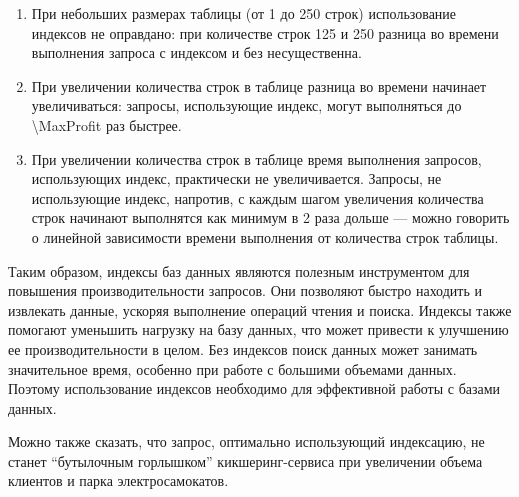 \begin{enumerate}
    \item При небольших размерах таблицы (от 1 до 250 строк) использование индексов не оправдано: при количестве строк 125 и 250 разница во времени выполнения запроса с индексом и без несущественна.
    \item При увеличении количества строк в таблице разница во времени начинает увеличиваться: запросы, использующие индекс, могут выполняться до \num[round-precision=0, round-mode=places]{\MaxProfit} раз быстрее.
    \item При увеличении количества строк в таблице время выполнения запросов, использующих индекс, практически не увеличивается. Запросы, не использующие индекс, напротив, с каждым шагом увеличения количества строк начинают выполнятся как минимум в 2 раза дольше --- можно говорить о линейной зависимости времени выполнения от количества строк таблицы.
\end{enumerate}

Таким образом, индексы баз данных являются полезным инструментом для повышения производительности запросов. Они позволяют быстро находить и извлекать данные, ускоряя выполнение операций чтения и поиска. Индексы также помогают уменьшить нагрузку на базу данных, что может привести к улучшению ее производительности в целом. Без индексов поиск данных может занимать значительное время, особенно при работе с большими объемами данных. Поэтому использование индексов необходимо для эффективной работы с базами данных.

Можно также сказать, что запрос, оптимально использующий индексацию, не станет \enquote{бутылочным горлышком} кикшеринг-сервиса при увеличении объема клиентов и парка электросамокатов.